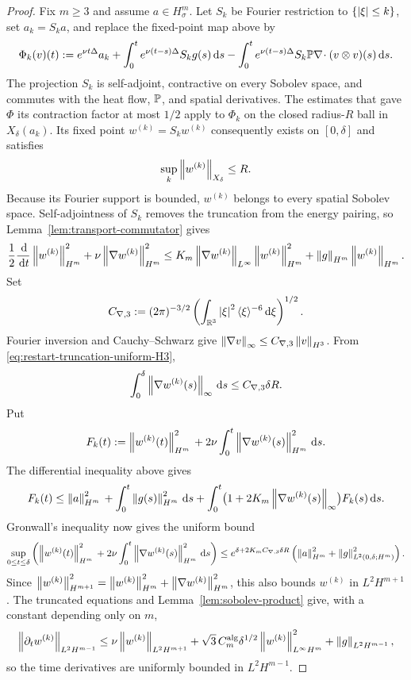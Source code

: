 \begin{proof}
Fix \(m\ge3\) and assume \(a\in H^m_\sigma\).  Let \(S_k\) be Fourier
restriction to \(\{\left|\xi\right|\le k\}\), set \(a_k=S_ka\), and replace the
fixed-point map above by
\[
 \Phi_k(v)(t):=e^{\nu t\Delta}a_k
 +\int_0^te^{\nu(t-s)\Delta}S_kg(s)\,\mathrm d s
 -\int_0^te^{\nu(t-s)\Delta}S_k\mathbb P\nabla\!\cdot
   (v\otimes v)(s)\,\mathrm d s.
\]
The projection \(S_k\) is self-adjoint, contractive on every Sobolev space,
and commutes with the heat flow, \(\mathbb P\), and spatial derivatives.  The estimates that gave \(\Phi\) its contraction factor at most \(1/2\) apply to
\(\Phi_k\) on the closed radius-\(R\) ball in \(X_\delta(a_k)\).  Its fixed point
\(w^{(k)}=S_kw^{(k)}\) consequently exists on \([0,\delta]\) and satisfies
\begin{equation}
 \sup_k\left\lVert w^{(k)}\right\rVert_{X_\delta}\le R.
 \label{eq:restart-truncation-uniform-H3}
\end{equation}
Because its Fourier support is bounded, \(w^{(k)}\) belongs to every spatial
Sobolev space.  Self-adjointness of \(S_k\) removes the truncation from the energy
pairing, so Lemma~\ref{lem:transport-commutator} gives
\[
 \frac12\frac{\,\mathrm d}{\,\mathrm d t}\left\lVert w^{(k)}\right\rVert_{H^m}^2
 +\nu\left\lVert \nabla w^{(k)}\right\rVert_{H^m}^2
 \le K_m\left\lVert \nabla w^{(k)}\right\rVert_{L^\infty}
       \left\lVert w^{(k)}\right\rVert_{H^m}^2
 +\left\lVert g\right\rVert_{H^m}\left\lVert w^{(k)}\right\rVert_{H^m}.
\]
Set
\[
 C_{\nabla,3}:=(2\pi)^{-3/2}
 \left(\int_{\mathbb R^3}\left|\xi\right|^2\langle\xi\rangle^{-6}\,\mathrm d\xi\right)^{1/2}.
\]
Fourier inversion and Cauchy--Schwarz give
\(\left\lVert \nabla v\right\rVert_\infty\le C_{\nabla,3}\left\lVert v\right\rVert_{H^3}\).  From
\eqref{eq:restart-truncation-uniform-H3},
\[
 \int_0^\delta\left\lVert \nabla w^{(k)}(s)\right\rVert_\infty\,\mathrm d s
 \le C_{\nabla,3}\delta R.
\]
Put
\[
 F_k(t):=\left\lVert w^{(k)}(t)\right\rVert_{H^m}^2
 {}+2\nu\int_0^t\left\lVert \nabla w^{(k)}(s)\right\rVert_{H^m}^2\,\mathrm d s.
\]
The differential inequality above gives
\[
 F_k(t)\le\left\lVert a\right\rVert_{H^m}^2
 {}+\int_0^t\left\lVert g(s)\right\rVert_{H^m}^2\,\mathrm d s
 {}+\int_0^t\bigl(1+2K_m\left\lVert \nabla w^{(k)}(s)\right\rVert_\infty\bigr)
 F_k(s)\,\mathrm d s.
\]
Gronwall's inequality now gives the uniform bound
\begin{equation}
 \sup_{0\le t\le\delta}\left(
 \left\lVert w^{(k)}(t)\right\rVert_{H^m}^2
{}+2\nu\int_0^t\left\lVert \nabla w^{(k)}(s)\right\rVert_{H^m}^2\,\mathrm d s
 \right)
 \le e^{\delta+2K_mC_{\nabla,3}\delta R}
 \left(\left\lVert a\right\rVert_{H^m}^2+\left\lVert g\right\rVert_{L^2(0,\delta;H^m)}^2\right).
 \label{eq:restart-truncation-uniform-Hm}
\end{equation}
Since
\(
 \left\lVert w^{(k)}\right\rVert_{H^{m+1}}^2
 =\left\lVert w^{(k)}\right\rVert_{H^m}^2+\left\lVert \nabla w^{(k)}\right\rVert_{H^m}^2
\), this also bounds \(w^{(k)}\) in \(L^2H^{m+1}\).  The truncated equations
and Lemma~\ref{lem:sobolev-product} give, with a constant depending only on
\(m\),
\[
 \left\lVert \partial_tw^{(k)}\right\rVert_{L^2H^{m-1}}
 \le \nu\left\lVert w^{(k)}\right\rVert_{L^2H^{m+1}}
 +\sqrt3\,C_m^{\rm alg}\delta^{1/2}
   \left\lVert w^{(k)}\right\rVert_{L^\infty H^m}^2
  +\left\lVert g\right\rVert_{L^2H^{m-1}},
\]
so the time derivatives are uniformly bounded in \(L^2H^{m-1}\).


\end{proof}
